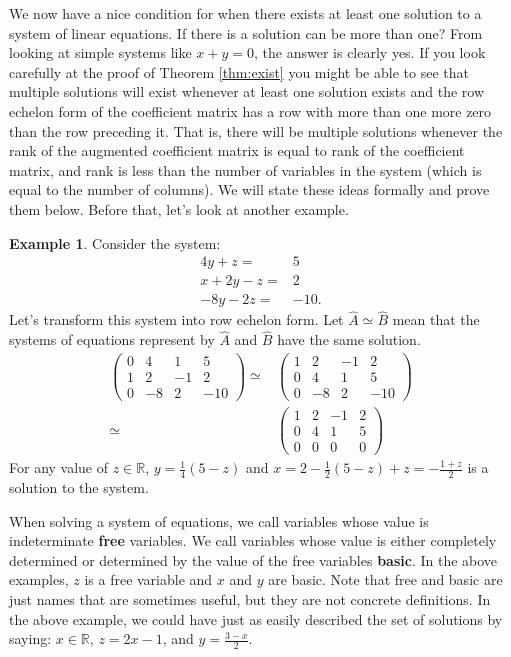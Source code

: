 \documentclass[12pt,reqno]{amsart}
\theoremstyle{definition}
\newtheorem{example}{Example}[section]
\begin{document}
We now have a nice condition for when there exists at least one
solution to a system of linear equations. If there is a solution can
be more than one? From looking at simple systems like $x + y = 0$, the
answer is clearly yes. If you look carefully at the proof of Theorem
\ref{thm:exist} you might be able to see that multiple solutions will
exist whenever at least one solution exists and the row echelon form
of the coefficient matrix has a row with more than one more zero than
the row preceding it. That is, there will be multiple solutions
whenever the rank of the augmented coefficient matrix is equal to rank
of the coefficient matrix, and rank is less than the number of
variables in the system (which is equal to the number of columns). We
will state these ideas formally and prove them below. Before that,
let's look at another example.
\begin{example}
  Consider the system:
  \begin{align*}
    4 y + z = & 5 \\    
    x + 2 y - z = & 2 \\
    -8y - 2z = & -10.
  \end{align*}
  Let's transform this system into row echelon form. Let $\hat{A}
  \simeq \hat{B}$ mean that the systems of equations represent by
  $\hat{A}$ and $\hat{B}$ have the same solution.
  \begin{align*}
    \begin{pmatrix} 
      0 & 4 & 1 & 5 \\ 
      1 & 2 & -1 & 2 \\
      0 & -8 & 2 & -10 
    \end{pmatrix}  \simeq &     
    \begin{pmatrix} 
      1 & 2 & -1 & 2 \\
      0 & 4 & 1 & 5 \\     
      0 & -8 & 2 & -10 
    \end{pmatrix}  \\
    \simeq & 
    \begin{pmatrix} 
      1 & 2 & -1 & 2 \\
      0 & 4 & 1 & 5 \\     
      0 & 0 & 0 & 0 
    \end{pmatrix}  
  \end{align*}
  For any value of $z\in \mathbb{R}$, $y = \frac{1}{4}(5 - z)$ and $x
  = 2 - \frac{1}{2}(5 - z) + z = -\frac{1+z}{2}$ is a solution to the
  system.  
\end{example}
When solving a system of equations, we call variables whose value is
indeterminate \textbf{free} variables. We call variables whose value
is either completely determined or determined by the value of the free
variables \textbf{basic}. In the above examples, $z$ is a free
variable and $x$ and $y$ are basic. Note that free and basic are
just names that are sometimes useful, but they are not concrete
definitions. In the above example, we could have just as easily
described the set of solutions by saying: $x \in \mathbb{R}$,
$z = 2x - 1$, and $y = \frac{3 - x}{2}$. 
\end{document}
